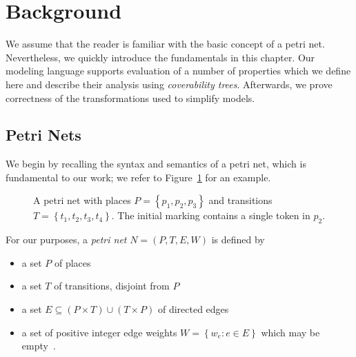 
\section{Background}\label{sec:background}

We assume that the reader is familiar with the basic concept of a petri net. Nevertheless, we quickly introduce the fundamentals in this chapter. Our modeling language supports evaluation of a number of properties which we define here and describe their analysis using \emph{coverability trees}. Afterwards, we prove correctness of the transformations used to simplify models.

\subsection{Petri Nets}\label{sec:background:definition}

We begin by recalling the syntax and semantics of a petri net, which is fundamental to our work; we refer to Figure~\ref{fig:background:example} for an example.

\begin{figure}
	\centering
	\caption{A petri net with places $P=\left\{p_1,p_2,p_3\right\}$ and transitions $T=\left\{t_1,t_2,t_3,t_4\right\}$. The initial marking contains a single token in $p_2$.}\label{fig:background:example}
\end{figure}

For our purposes, a \emph{petri net} $N=(P,T,E,W)$ is defined by
\begin{itemize}
    \item a set $P$ of places
    \item a set $T$ of transitions, disjoint from $P$
    \item a set $E\subseteq\left(P\times T\right)\cup\left(T\times P\right)$ of directed edges
    \item a set of positive integer edge weights $W=\left\{w_e:e\in E\right\}$ which may be empty~\cite{murata1989petri}.
\end{itemize}

